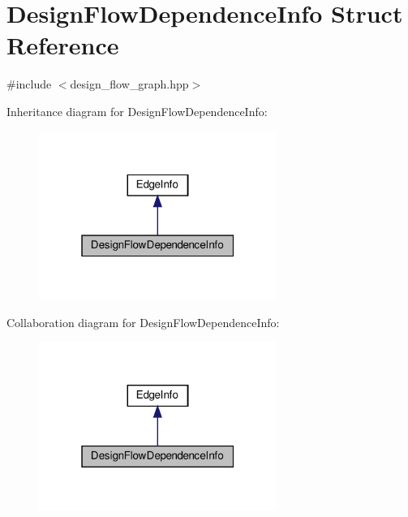 \hypertarget{structDesignFlowDependenceInfo}{}\section{Design\+Flow\+Dependence\+Info Struct Reference}
\label{structDesignFlowDependenceInfo}


{\ttfamily \#include $<$design\+\_\+flow\+\_\+graph.\+hpp$>$}



Inheritance diagram for Design\+Flow\+Dependence\+Info\+:
\nopagebreak
\begin{figure}[H]
\begin{center}
\leavevmode
\includegraphics[width=220pt]{d9/db8/structDesignFlowDependenceInfo__inherit__graph}
\end{center}
\end{figure}


Collaboration diagram for Design\+Flow\+Dependence\+Info\+:
\nopagebreak
\begin{figure}[H]
\begin{center}
\leavevmode
\includegraphics[width=220pt]{d4/d31/structDesignFlowDependenceInfo__coll__graph}
\end{center}
\end{figure}
